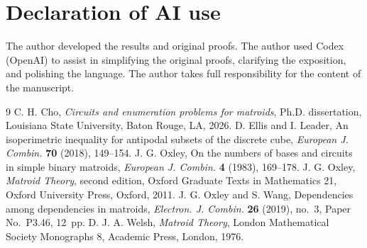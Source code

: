 \documentclass[10pt,a4paper]{article}
\numberwithin{equation}{section}
\begin{document}
\section*{Declaration of AI use}
The author developed the results and original proofs.
The author used Codex (OpenAI) to assist in simplifying the original proofs, clarifying the exposition, and polishing the language.
The author takes full responsibility for the content of the manuscript.

\begin{thebibliography}{9}
\setlength{\itemsep}{2pt}
\setlength{\parsep}{0pt}
\setlength{\parskip}{0pt}
C. H. Cho,
\emph{Circuits and enumeration problems for matroids},
Ph.D. dissertation, Louisiana State University, Baton Rouge, LA, 2026.
D. Ellis and I. Leader,
An isoperimetric inequality for antipodal subsets of the discrete cube,
\emph{European J. Combin.} \textbf{70} (2018), 149--154.
J. G. Oxley,
On the numbers of bases and circuits in simple binary matroids,
\emph{European J. Combin.} \textbf{4} (1983), 169--178.
J. G. Oxley,
\emph{Matroid Theory}, second edition,
Oxford Graduate Texts in Mathematics 21,
Oxford University Press, Oxford, 2011.
J. G. Oxley and S. Wang,
Dependencies among dependencies in matroids,
\emph{Electron. J. Combin.} \textbf{26} (2019), no.~3, Paper No.~P3.46, 12~pp.
D. J. A. Welsh,
\emph{Matroid Theory},
London Mathematical Society Monographs 8,
Academic Press, London, 1976.
\end{thebibliography}
\end{document}
